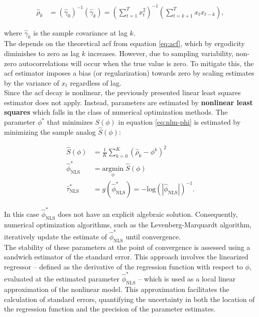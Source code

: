 \documentclass[main.tex]{subfiles}
\begin{document}
\begin{align}\label{eq:acf_}
    \hat\rho_k &= (\hat\gamma_0)^{-1}(\hat\gamma_k) = (\sum_{t=1}^T x_t^2)^{-1} (\sum_{t=k+1}^{T}x_t x_{t-k}),
\end{align}

where $\hat\gamma_k$ is the sample covariance at lag $k$.\\


The  depends on the theoretical acf from equation \eqref{eq:acf}, which by ergodicity diminishes to zero as lag $k$ increases. However, due to sampling variability, non-zero autocorrelations will occur when the true value is zero. To mitigate this, the acf estimator imposes a bias (or regularization) towards zero by scaling estimates by the variance of $x_t$ regardless of lag.\\


Since the acf decay is nonlinear, the previously presented linear least squares estimator does not apply. Instead, parameters are estimated by \textbf{nonlinear least squares} which falls in the class of numerical optimization methods. The parameter $\phi^*$ that minimizes $S(\phi)$ in equation \eqref{eq:nlm-phi} is estimated by minimizing the sample analog $\hat S(\phi)$:

\begin{align}
    \hat S(\phi) &= \frac{1}{K} \sum_{k=0}^K (\hat\rho_k - \phi^k)^2\\
    \hat \phi^*_{\text{NLS}} &= \underset{\phi}{\text{argmin}} \; \hat S(\phi)\\
    \hat \tau^*_{\text{NLS}} &= g(\hat \phi^*_{\text{NLS}}) = -{\text{log}(|\hat\phi_{\text{NLS}}|)}^{-1}.
\end{align}

In this case $\hat \phi^*_{\text{NLS}}$ does not have an explicit algebraic solution. Consequently, numerical optimization algorithms, such as the Levenberg-Marquardt \cite{watson_levenberg-marquardt_1978} algorithm, iteratively update the estimate of $\hat \phi^*_{\text{NLS}}$ until convergence. \\

The stability of these parameters at the point of convergence is assessed using a sandwich estimator of the standard error. This approach involves the linearized regressor -- defined as the derivative of the regression function with respect to $\phi$, evaluated at the estimated parameter $\hat \phi^*_{\text{NLS}}$ -- which is used as a local linear approximation of the nonlinear model. This approximation facilitates the calculation of standard errors, quantifying the uncertainty in both the location of the regression function and the precision of the parameter estimates.
\end{document}
